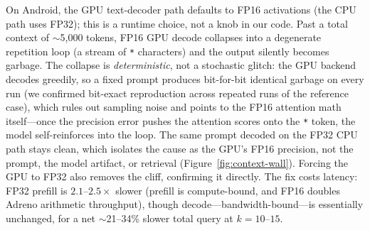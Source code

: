 On Android, the GPU text-decoder path defaults to FP16 activations (the CPU
path uses FP32); this is a runtime choice, not a knob in our code. Past a total
context of $\sim$5{,}000 tokens, FP16 GPU decode collapses into a degenerate
repetition loop (a stream of \texttt{*} characters) and the output silently
becomes garbage. The collapse is \emph{deterministic}, not a stochastic glitch:
the GPU backend decodes greedily, so a fixed prompt produces bit-for-bit
identical garbage on every run (we confirmed bit-exact reproduction across
repeated runs of the reference case), which rules out sampling noise and points
to the FP16 attention math itself---once the precision error pushes the
attention scores onto the \texttt{*} token, the model self-reinforces into the
loop. The same prompt decoded on the FP32 CPU path stays clean, which isolates
the cause as the GPU's FP16 precision, not the prompt, the model artifact, or
retrieval (Figure~\ref{fig:context-wall}). Forcing the GPU to FP32 also removes
the cliff, confirming it directly. The fix costs latency: FP32 prefill is
$2.1$--$2.5\times$ slower (prefill is compute-bound, and FP16 doubles Adreno
arithmetic throughput), though decode---bandwidth-bound---is essentially
unchanged, for a net $\sim$21--34\% slower total query at $k=10$--$15$.

